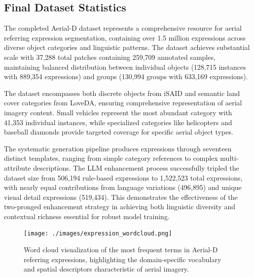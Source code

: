 \subsection{Final Dataset Statistics}

The completed Aerial-D dataset represents a comprehensive resource for aerial referring expression segmentation, containing over 1.5 million expressions across diverse object categories and linguistic patterns. The dataset achieves substantial scale with 37,288 total patches containing 259,709 annotated samples, maintaining balanced distribution between individual objects (128,715 instances with 889,354 expressions) and groups (130,994 groups with 633,169 expressions).

The dataset encompasses both discrete objects from iSAID and semantic land cover categories from LoveDA, ensuring comprehensive representation of aerial imagery content. Small vehicles represent the most abundant category with 41,353 individual instances, while specialized categories like helicopters and baseball diamonds provide targeted coverage for specific aerial object types.

The systematic generation pipeline produces expressions through seventeen distinct templates, ranging from simple category references to complex multi-attribute descriptions. The LLM enhancement process successfully tripled the dataset size from 506,194 rule-based expressions to 1,522,523 total expressions, with nearly equal contributions from language variations (496,895) and unique visual detail expressions (519,434). This demonstrates the effectiveness of the two-pronged enhancement strategy in achieving both linguistic diversity and contextual richness essential for robust model training.

\begin{figure}[H]
\centering
\texttt{[image: ./images/expression\_wordcloud.png]}
\caption{Word cloud visualization of the most frequent terms in Aerial-D referring expressions, highlighting the domain-specific vocabulary and spatial descriptors characteristic of aerial imagery.}
\label{fig:expression_wordcloud}
\end{figure}

